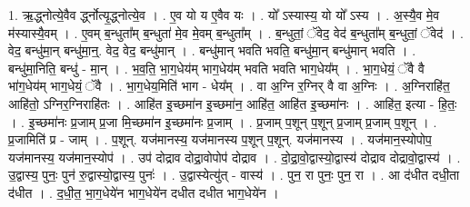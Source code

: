 \documentclass[17pt]{extarticle}
\begin{document}
1. ऋ॒द्ध्नोत्ये॒वैव र्द्ध्नोत्यृ॒द्ध्नोत्ये॒व । . ए॒व यो य ए॒वैव यः । . यो᳚ ऽस्यास्य॒ यो यो᳚ ऽस्य । . अ॒स्यै॒व मे॒व म॑स्यास्यै॒वम् । . ए॒वम् ब॒न्धुता᳚म् ब॒न्धुता॑ मे॒व मे॒वम् ब॒न्धुता᳚म् । . ब॒न्धुतां॒ ॅवेद॒ वेद॑ ब॒न्धुता᳚म् ब॒न्धुतां॒ ॅवेद॑ । . वेद॒ बन्धु॑मा॒न् बन्धु॑मा॒न्॒. वेद॒ वेद॒ बन्धु॑मान् । . बन्धु॑मान् भवति भवति॒ बन्धु॑मा॒न् बन्धु॑मान् भवति । . बन्धु॑मा॒निति॒ बन्धु॑ - मा॒न् । . भ॒व॒ति॒ भा॒ग॒धेय॑म् भाग॒धेय॑म् भवति भवति भाग॒धेय᳚म् । . भा॒ग॒धेयं॒ ॅवै वै भा॑ग॒धेय॑म् भाग॒धेयं॒ ॅवै । . भा॒ग॒धेय॒मिति॑ भाग - धेय᳚म् । . वा अ॒ग्नि र॒ग्निर् वै वा अ॒ग्निः । . अ॒ग्निराहि॑त॒ आहि॑तो॒ ऽग्निर॒ग्निराहि॑तः । . आहि॑त इ॒च्छमा॑न इ॒च्छमा॑न॒ आहि॑त॒ आहि॑त इ॒च्छमा॑नः । . आहि॑त॒ इत्या - हि॒तः॒ । . इ॒च्छमा॑नः प्र॒जाम् प्र॒जा मि॒च्छमा॑न इ॒च्छमा॑नः प्र॒जाम् । . प्र॒जाम् प॒शून् प॒शून् प्र॒जाम् प्र॒जाम् प॒शून् । . प्र॒जामिति॑ प्र - जाम् । . प॒शून्. यज॑मानस्य॒ यज॑मानस्य प॒शून् प॒शून्. यज॑मानस्य । . यज॑मान॒स्योपोप॒ यज॑मानस्य॒ यज॑मान॒स्योप॑ । . उप॑ दोद्राव दोद्रा॒वोपोप॑ दोद्राव । . दो॒द्रा॒वो॒द्वास्यो॒द्वास्य॑ दोद्राव दोद्रावो॒द्वास्य॑ । . उ॒द्वास्य॒ पुनः॒ पुन॑ रु॒द्वास्यो॒द्वास्य॒ पुनः॑ । . उ॒द्वास्येत्यु॑त् - वास्य॑ । . पुन॒ रा पुनः॒ पुन॒ रा । . आ द॑धीत दधी॒ता द॑धीत । . द॒धी॒त॒ भा॒ग॒धेये॑न भाग॒धेये॑न दधीत दधीत भाग॒धेये॑न । \newline
\end{document}
